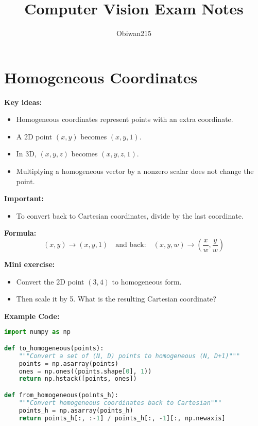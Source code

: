 \documentclass[a4paper,11pt]{article}
\title{Computer Vision Exam Notes}
\author{Obiwan215}
\date{}
\begin{document}
\maketitle
\tableofcontents
\newpage

\section{Homogeneous Coordinates}

\textbf{Key ideas:}
\begin{itemize}
    \item Homogeneous coordinates represent points with an extra coordinate.
    \item A 2D point $(x, y)$ becomes $(x, y, 1)$.
    \item In 3D, $(x, y, z)$ becomes $(x, y, z, 1)$.
    \item Multiplying a homogeneous vector by a nonzero scalar does not change the point.
\end{itemize}

\textbf{Important:}
\begin{itemize}
    \item To convert back to Cartesian coordinates, divide by the last coordinate.
\end{itemize}

\textbf{Formula:}
\[
(x, y) \rightarrow (x, y, 1) \quad \text{and back:} \quad (x, y, w) \rightarrow \left( \frac{x}{w}, \frac{y}{w} \right)
\]

\textbf{Mini exercise:}
\begin{itemize}
    \item Convert the 2D point $(3, 4)$ to homogeneous form.
    \item Then scale it by 5. What is the resulting Cartesian coordinate?
\end{itemize}

\vspace{1em}

\textbf{Example Code:}
\begin{lstlisting}[language=Python]
import numpy as np

def to_homogeneous(points):
    """Convert a set of (N, D) points to homogeneous (N, D+1)"""
    points = np.asarray(points)
    ones = np.ones((points.shape[0], 1))
    return np.hstack([points, ones])

def from_homogeneous(points_h):
    """Convert homogeneous coordinates back to Cartesian"""
    points_h = np.asarray(points_h)
    return points_h[:, :-1] / points_h[:, -1][:, np.newaxis]
\end{lstlisting}
\end{document}
